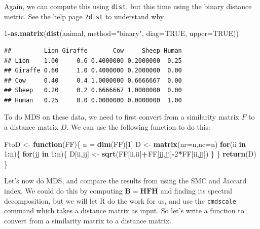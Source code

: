 \documentclass[
]{book}
\newenvironment{Shaded}{\begin{snugshade}}{\end{snugshade}}
\newcommand{\AttributeTok}[1]{\textcolor[rgb]{0.13,0.29,0.53}{#1}}
\newcommand{\ConstantTok}[1]{\textcolor[rgb]{0.56,0.35,0.01}{#1}}
\newcommand{\ControlFlowTok}[1]{\textcolor[rgb]{0.13,0.29,0.53}{\textbf{#1}}}
\newcommand{\DecValTok}[1]{\textcolor[rgb]{0.00,0.00,0.81}{#1}}
\newcommand{\FunctionTok}[1]{\textcolor[rgb]{0.13,0.29,0.53}{\textbf{#1}}}
\newcommand{\NormalTok}[1]{#1}
\newcommand{\OtherTok}[1]{\textcolor[rgb]{0.56,0.35,0.01}{#1}}
\newcommand{\SpecialCharTok}[1]{\textcolor[rgb]{0.81,0.36,0.00}{\textbf{#1}}}
\newcommand{\StringTok}[1]{\textcolor[rgb]{0.31,0.60,0.02}{#1}}
\theoremstyle{definition}
\theoremstyle{definition}
\theoremstyle{definition}
\theoremstyle{definition}
\theoremstyle{remark}
\begin{document}
Again, we can compute this using \texttt{dist}, but this time using the binary distance metric. See the help page \texttt{?dist} to understand why.

\begin{Shaded}
\begin{Highlighting}[]
\DecValTok{1}\SpecialCharTok{{-}}\FunctionTok{as.matrix}\NormalTok{(}\FunctionTok{dist}\NormalTok{(animal, }\AttributeTok{method=}\StringTok{"binary"}\NormalTok{, }\AttributeTok{diag=}\ConstantTok{TRUE}\NormalTok{, }\AttributeTok{upper=}\ConstantTok{TRUE}\NormalTok{))}
\end{Highlighting}
\end{Shaded}

\begin{verbatim}
##         Lion Giraffe       Cow     Sheep Human
## Lion    1.00     0.6 0.4000000 0.2000000  0.25
## Giraffe 0.60     1.0 0.4000000 0.2000000  0.00
## Cow     0.40     0.4 1.0000000 0.6666667  0.00
## Sheep   0.20     0.2 0.6666667 1.0000000  0.00
## Human   0.25     0.0 0.0000000 0.0000000  1.00
\end{verbatim}

To do MDS on these data, we need to first convert from a similarity matrix \(F\) to a distance matrix \(D\). We can use the following function to do this:

\begin{Shaded}
\begin{Highlighting}[]
\NormalTok{FtoD }\OtherTok{\textless{}{-}} \ControlFlowTok{function}\NormalTok{(FF)\{}
\NormalTok{  n }\OtherTok{=} \FunctionTok{dim}\NormalTok{(FF)[}\DecValTok{1}\NormalTok{]}
\NormalTok{  D }\OtherTok{\textless{}{-}} \FunctionTok{matrix}\NormalTok{(}\AttributeTok{nr=}\NormalTok{n,}\AttributeTok{nc=}\NormalTok{n)}
  \ControlFlowTok{for}\NormalTok{(ii }\ControlFlowTok{in} \DecValTok{1}\SpecialCharTok{:}\NormalTok{n)\{}
    \ControlFlowTok{for}\NormalTok{(jj }\ControlFlowTok{in} \DecValTok{1}\SpecialCharTok{:}\NormalTok{n)\{}
\NormalTok{      D[ii,jj] }\OtherTok{\textless{}{-}} \FunctionTok{sqrt}\NormalTok{(FF[ii,ii]}\SpecialCharTok{+}\NormalTok{FF[jj,jj]}\SpecialCharTok{{-}}\DecValTok{2}\SpecialCharTok{*}\NormalTok{FF[ii,jj])}
\NormalTok{    \}}
\NormalTok{  \}}
  \FunctionTok{return}\NormalTok{(D)}
\NormalTok{\}}
\end{Highlighting}
\end{Shaded}

Let's now do MDS, and compare the results from using the SMC and Jaccard index. We could do this by computing \(\mathbf B= \mathbf H\mathbf F\mathbf H\) and finding its spectral decomposition, but we will let R do the work for us, and use the \texttt{cmdscale} command which takes a distance matrix as input. So let's write a function to convert from a similarity matrix to a distance matrix.
\end{document}
